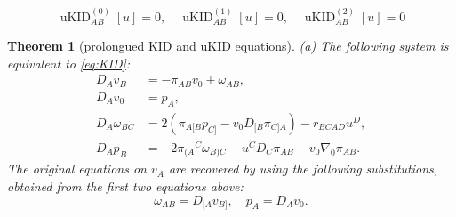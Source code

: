 \documentclass[10pt,a4paper]{amsart}
\newtheorem{thm}{Theorem}
\newcommand{\uKIDi}{\operatorname{uKID}^{(1)}}
\newcommand{\uKIDii}{\operatorname{uKID}^{(2)}}
\newcommand{\uKIDo}{\operatorname{uKID}^{(0)}}
\begin{document}
\begin{equation} \label{eq:uKID}
	\uKIDo_{AB}[u] = 0 , \quad
	\uKIDi_{AB}[u] = 0 , \quad
	\uKIDii_{AB}[u] = 0
\end{equation}

\begin{thm}[prolongued KID and uKID equations] \label{thm:canuKID}
(a) The following system is equivalent to \eqref{eq:KID}:
\begin{equation} \label{eq:canKID}
\begin{aligned}
D_A v_B &= -\pi_{AB} v_0 + \omega_{AB} , \\
D_A v_0 &= p_A , \\
D_A \omega_{BC} &= 2 (\pi_{A[B} p_{C]} - v_0 D_{[B} \pi_{C]A}) - r_{BCAD}
u^D , \\
D_A p_B &= -2\pi_{(A}{}^C \omega_{B)C} - u^C D_C \pi_{AB} - v_0 \nabla_0 \pi_{AB} .
\end{aligned}
\end{equation}
The original equations on $v_A$ are recovered by using the following
substitutions, obtained from the first two equations above:
\begin{equation} \label{eq:canKID-defs}
	\omega_{AB} = D_{[A} v_{B]} , \quad
	p_A = D_A v_0 .
\end{equation}


\end{thm}
\end{document}
